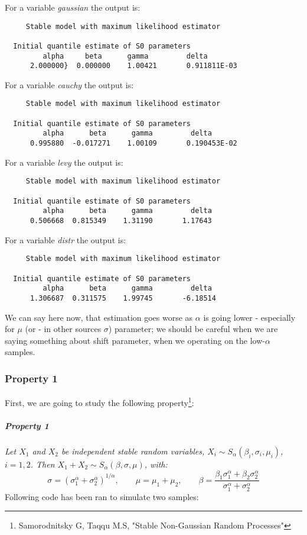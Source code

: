 \documentclass{article}
\begin{document}
	For a variable \textit{gaussian} the output is:
	\begin{lstlisting}
	 Stable model with maximum likelihood estimator
	 
  Initial quantile estimate of S0 parameters
         alpha     beta      gamma         delta
      2.000000}  0.000000    1.00421       0.911811E-03   
\end{lstlisting}       
   
For a variable \textit{cauchy} the output is:
\begin{lstlisting}
	 Stable model with maximum likelihood estimator
	 
  Initial quantile estimate of S0 parameters
         alpha      beta      gamma         delta
      0.995880  -0.017271    1.00109       0.190453E-02
\end{lstlisting} 

For a variable \textit{levy} the output is:\\
\begin{lstlisting}
	 Stable model with maximum likelihood estimator
	 
  Initial quantile estimate of S0 parameters
         alpha      beta      gamma         delta
      0.506668  0.815349    1.31190       1.17643   
\end{lstlisting} 

For a variable \textit{distr} the output is:
\begin{lstlisting}
	 Stable model with maximum likelihood estimator
	 
  Initial quantile estimate of S0 parameters
         alpha      beta      gamma         delta
      1.306687  0.311575    1.99745       -6.18514   
\end{lstlisting}  
We can say here now, that estimation goes worse as $\alpha$ is going lower - especially for $\mu$ (or - in other sources $\sigma$) parameter; we should be careful when we are saying something about shift parameter, when we operating on the low-$\alpha$ samples.

\subsubsection{Property 1}
First, we are going to study the following property\footnote{Samorodnitsky G, Taqqu M.S, "Stable Non-Gaussian Random Processes"}:
\subparagraph{Property 1}
\textit{Let $X_1$ and $X_2$ be independent stable random variables, $X_i \sim S_\alpha(\beta_i, \sigma_i, \mu_i)$, $i = 1,2$. Then $X_1 + X_2 \sim S_\alpha(\beta, \sigma, \mu)$, with: }
\begin{equation}
\sigma = (\sigma_1^\alpha + \sigma_2^\alpha)^{1/\alpha}, \qquad \mu = \mu_1 + \mu_2, \qquad \beta = \frac{\beta_1\sigma_1^\alpha + \beta_2\sigma_2^\alpha}{\sigma_1^\alpha + \sigma_2^\alpha}
\end{equation}
Following code has been ran to simulate two samples:
\end{document}
